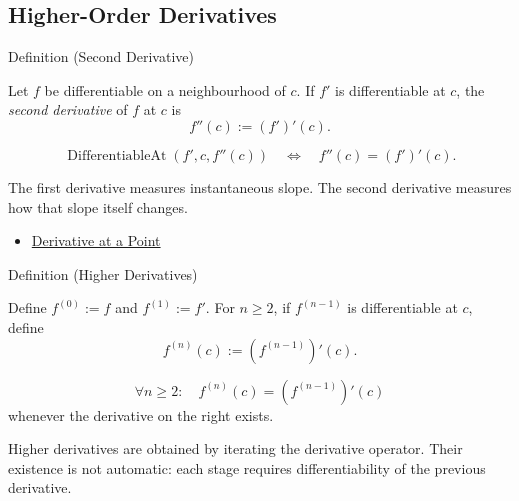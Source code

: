 \subsection{Higher-Order Derivatives}

\begin{definitionbox}{Definition (Second Derivative)}
\begin{definition}
\label{def:second-derivative}
Let $f$ be differentiable on a neighbourhood of $c$. If $f'$ is differentiable at $c$, the \emph{second derivative} of $f$ at $c$ is
\[
  f''(c):=(f')'(c).
\]
\end{definition}
\end{definitionbox}

\begin{remark*}
\[
  \operatorname{DifferentiableAt}(f',c,f''(c))
  \quad\Longleftrightarrow\quad
  f''(c)=(f')'(c).
\]
\end{remark*}

\begin{remark*}[Interpretation]
The first derivative measures instantaneous slope. The second derivative measures how that slope itself changes.
\end{remark*}

\begin{dependencies}
\begin{itemize}
  \item \hyperref[def:derivative-at-a-point]{Derivative at a Point}
\end{itemize}
\end{dependencies}

\begin{definitionbox}{Definition (Higher Derivatives)}
\begin{definition}
\label{def:higher-derivatives}
Define $f^{(0)}:=f$ and $f^{(1)}:=f'$. For $n\geq 2$, if $f^{(n-1)}$ is differentiable at $c$, define
\[
  f^{(n)}(c):=(f^{(n-1)})'(c).
\]
\end{definition}
\end{definitionbox}

\begin{remark*}
\[
  \forall n\geq 2:\quad
  f^{(n)}(c)=(f^{(n-1)})'(c)
\]
whenever the derivative on the right exists.
\end{remark*}

\begin{remark*}[Interpretation]
Higher derivatives are obtained by iterating the derivative operator. Their existence is not automatic: each stage requires differentiability of the previous derivative.
\end{remark*}

